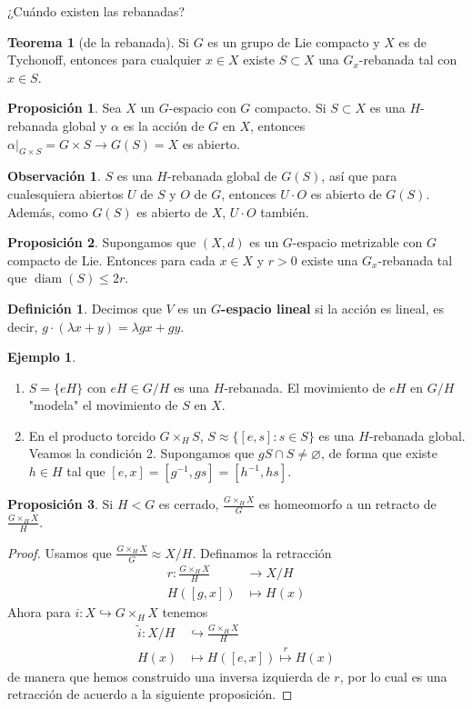 \documentclass[spanish]{article}
\theoremstyle{definition}
\newtheorem*{defn}{Definición}
\newtheorem*{obs}{Observación}
\newtheorem*{teo}{Teorema}
\newtheorem*{prop}{Proposición}
\newtheorem*{ejem}{Ejemplo}
\DeclareMathOperator{\diam}{diam}
\begin{document}
¿Cuándo existen las rebanadas?
\begin{teo}[de la rebanada]
	Si $G$ es un grupo de Lie compacto y $X$ es de Tychonoff, entonces para cualquier $x\in X$ existe $S\subset X$ una $G_x$-rebanada tal con $x\in S$.
\end{teo}
\begin{prop}
	Sea $X$ un $G$-espacio con $G$ compacto. Si $S\subset X$ es una $H$-rebanada global y $\alpha$ es la acción de $G$ en $X$, entonces $\alpha|_{G\times S}=G\times S\to G(S)=X$ es abierto.
\end{prop}
\begin{obs}
	$S$ es una $H$-rebanada global de $G(S)$, así que para cualesquiera abiertos $U$ de $S$ y $O$ de $G$, entonces $U\cdot O$ es abierto de $G(S)$. Además, como $G(S)$ es abierto de $X$, $U\cdot O$ también.
\end{obs}
\begin{prop}
	Supongamos que $(X,d)$ es un $G$-espacio metrizable con $G$ compacto de Lie. Entonces para cada $x\in X$ y $r>0$ existe una $G_x$-rebanada tal que $\diam(S)\leq2r$.
\end{prop}
\begin{defn}
	Decimos que $V$ es un \textbf{$G$-espacio lineal} si la acción es lineal, es decir, $g\cdot(\lambda x+y)=\lambda gx+gy$.
\end{defn}
\clearpage
\begin{ejem}\leavevmode
	\begin{enumerate}
		\item $S=\{eH\}$ con $eH\in G/H$ es una $H$-rebanada. El movimiento de $eH$ en $G/H$ "modela" el movimiento de $S$ en $X$.
		\item En el producto torcido $G\times_HS$, $S\approx\{[e,s]:s\in S\}$ es una $H$-rebanada global. Veamos la condición 2. Supongamos que $gS\cap S\neq\varnothing$, de forma que existe $h\in H$ tal que $[e,x]=[g^{-1},gs]=[h^{-1},hs]$.
	\end{enumerate}
\end{ejem}
\begin{prop}
	Si $H<G$ es cerrado, $\frac{G\times_HX}{G}$ es homeomorfo a un retracto de $\frac{G\times_HX}{H}$.
\end{prop}
\begin{proof}
	Usamos que $\frac{G\times_HX}{G}\approx X/H$. Definamos la retracción
	\begin{align*}
		r:\frac{G\times_HX}{H}&\to X/H\\
		H([g,x])&\mapsto H(x)
	\end{align*}
	Ahora para $i:X\hookrightarrow G\times_HX$ tenemos \begin{align*}
		\tilde{i}:X/H&\hookrightarrow\frac{G\times_HX}{H}\\
		H(x)&\mapsto H([e,x])\overset{r}{\mapsto}H(x)
	\end{align*}
	de manera que hemos construido una inversa izquierda de $r$, por lo cual es una retracción de acuerdo a la siguiente proposición.
\end{proof}
\end{document}

